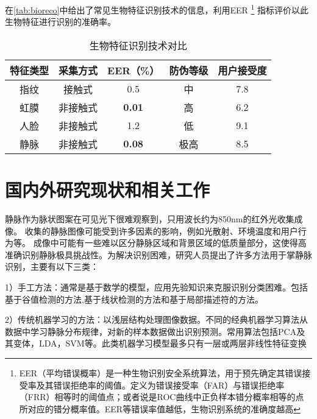 在\autoref{tab:bioreco}中给出了常见生物特征识别技术的信息，利用EER
\footnote{
    EER（平均错误概率）是一种生物识别安全系统算法，用于预先确定其错误接受率及其错误拒绝率的阈值。定义为错误接受率（FAR）与错误拒绝率（FRR）相等时的阈值点；或者说是ROC曲线中正负样本错分概率相等的点所对应的错分概率值。EER等错误率值越低，生物识别系统的准确度越高
    }
    指标评价以此生物特征进行识别的准确率。

\begin{table}[h] %
    \centering
    \caption{生物特征识别技术对比}
    \begin{tabular}{*{5}{c}}
        \toprule
        特征类型    & 采集方式      & EER（\%）      & 防伪等级     & 用户接受度      \\
        \midrule
        指纹       & 接触式         & 0.5           & 中           &  7.8              \\
        虹膜       & 非接触式       & \textbf{0.01} & 高           &  6.2             \\
        人脸       & 非接触式       & 1.2           & 低           &  9.1               \\
        静脉       & 非接触式       & \textbf{0.08} & 极高         &  8.5               \\
        \bottomrule
    \end{tabular}
    \label{tab:bioreco}
\end{table}

\section{国内外研究现状和相关工作}
\label{sec:related_work}

静脉作为脉状图案在可见光下很难观察到，只用波长约为850nm的红外光收集成像。
收集的静脉图像可能受到许多因素的影响，例如光散射\cite{yang2014towards}、环境温度\cite{kumar2011human}和用户行为\cite{miura2007extraction}等。
成像中可能有一些难以区分静脉区域和背景区域的低质量部分，这使得高准确识别静脉极具挑战性。为解决识别困难，研究人员提出了许多方法用于掌静脉识别，主要有以下三类：

1）手工方法：通常是基于数学的模型，应用先验知识来克服识别分类困难\cite{nanni2017handcrafted}。包括基于谷值检测的方法\cite{miura2007extraction},基于线状检测的方法\cite{kumar2011human}和基于局部描述符的方法\cite{kang2014contactless}。

2）传统机器学习的方法：以浅层结构处理图像数据\cite{wang2021comparative}。不同的经典机器学习算法从数据中学习静脉分布规律，对新的样本数据做出识别预测。常用算法包括PCA及其变体，LDA，SVM等。此类机器学习模型最多只有一层或两层非线性特征变换

